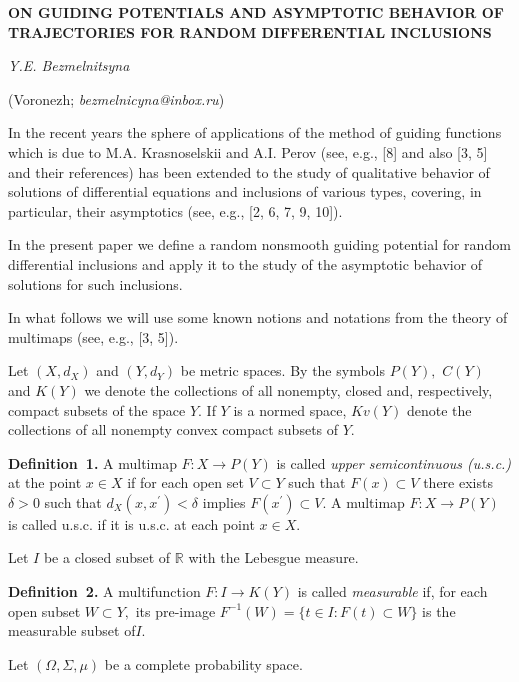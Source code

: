 
\begin{center}
    {\bf ON GUIDING POTENTIALS AND ASYMPTOTIC BEHAVIOR OF TRAJECTORIES FOR RANDOM DIFFERENTIAL INCLUSIONS}

    {\it Y.E. Bezmelnitsyna }

    (Voronezh; {\it bezmelnicyna@inbox.ru})
\end{center}


In the recent years the sphere of applications of the method of guiding functions which is due to M.A. Krasnoselskii and A.I. Perov (see, e.g., [8] and also [3, 5] and their references) has been extended to the study of qualitative behavior of solutions of differential equations and inclusions of various types, covering, in particular, their asymptotics (see, e.g., [2, 6, 7, 9, 10]).

In the present paper we define a random nonsmooth guiding potential for random differential inclusions and apply it to the study of the asymptotic behavior of solutions for such inclusions.

In what follows we will use some known notions and notati\-ons from the theory of multimaps (see, e.g., [3, 5]).

Let $(X,d_X)$ and $(Y,d_Y)$ be metric spaces. By the symbols $P(Y),$ $C(Y)$ and $K(Y)$ we denote the collections of all nonempty, closed and, respectively, compact subsets of the space $Y.$ If $Y$ is a normed space, $Kv(Y)$ denote the collections of all nonempty convex compact subsets of $Y.$

\textbf{Definition~1.}
A multimap $F:X \to P(Y)$ is called {\it upper semicontinuous (u.s.c.)} at the point $x\in X$ if for each open set $V \subset Y$ such that $F(x) \subset V$ there exists $\delta >0$ such that $d_X(x,x^\prime)<\delta$ implies $F(x^\prime)\subset V.$ A multimap $F:X \to P(Y)$ is called u.s.c. if it is u.s.c. at each point $x\in X.$

Let $I$ be a closed subset of $\mathbb{R}$ with the Lebesgue measure.

\textbf{Definition~2.}
A multifunction $F:I \to K(Y)$ is called {\it measurable} if, for each open subset $W \subset Y,$ its pre-image \linebreak
$F^{-1}(W)=\{t\in I:F(t)\subset W\}$ is the measurable subset of$I.$

Let $(\Omega,\Sigma,\mu)$ be a complete probability space.


